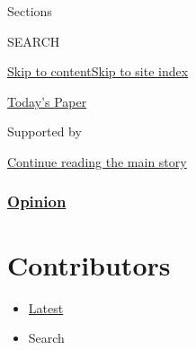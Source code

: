 Sections

SEARCH

\protect\hyperlink{site-content}{Skip to
content}\protect\hyperlink{site-index}{Skip to site index}

\href{https://myaccount.nytimes3xbfgragh.onion/auth/login?response_type=cookie\&client_id=vi}{}

\href{https://www.nytimes3xbfgragh.onion/section/todayspaper}{Today's
Paper}

Supported by

\protect\hyperlink{after-sponsor}{Continue reading the main story}

\hypertarget{opinion}{%
\subsubsection{\texorpdfstring{\href{/section/opinion}{Opinion}}{Opinion}}\label{opinion}}

\hypertarget{contributors}{%
\section{Contributors}\label{contributors}}

\begin{itemize}
\tightlist
\item
  \protect\hyperlink{stream-panel}{Latest}
\item
  Search
\end{itemize}

